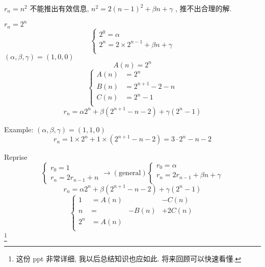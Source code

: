 \documentclass[mode=geye]{elegantnote}
\begin{document}
$ r_n = n^2 $ 不能推出有效信息, $ n^2 = 2(n-1)^2+\beta n + \gamma $ , 推不出合理的解.

$ r_n = 2^n $ 
\begin{equation*}
    \left\{
        \begin{array}{l}
            2^0=\alpha\\
            2^n=2\times 2^{n-1} + \beta n + \gamma\\
        \end{array}
    \right.
\end{equation*}
$ (\alpha, \beta, \gamma) = (1,0,0) $ 
\begin{equation*}
    A(n)=2^n
\end{equation*}
\begin{equation*}
    \left\{
        \begin{array}{ll}
            A(n) &= 2^n \\
            B(n) &= 2^{n+1}-2-n \\
            C(n) &= 2^n-1 \\
        \end{array}
    \right.
\end{equation*}
\begin{equation*}
    r_n = \alpha 2^n + \beta(2^{n+1}-n-2)+\gamma(2^n-1)
\end{equation*}

Example: 
$ (\alpha,\beta,\gamma)=(1,1,0) $ 
\begin{equation*}
    r_n = 1\times 2^n + 1\times (2^{n+1}-n-2) = 3\cdot 2^n-n-2
\end{equation*}

Reprise
\begin{equation*}
    \left\{
        \begin{array}{l}
            r_0 = 1\\
            r_n=2r_{n-1}+n
        \end{array}
    \right. \rightarrow(\text{general})
    \left\{
        \begin{array}{l}
            r_0 = \alpha\\
            r_n = 2r_{n-1}+\beta n+ \gamma\\
        \end{array}
    \right.
\end{equation*}
\begin{equation*}
    r_n = \alpha 2^n + \beta(2^{n+1}-n-2)+\gamma(2^n-1)
\end{equation*}
\begin{equation*}
    \left\{
        \begin{array}{llll}
            1   &= A(n)     &       &-C(n)  \\
            n   &=          &-B(n)  &+2C(n) \\
            2^n &= A(n)     &       &       \\
        \end{array}
    \right.
\end{equation*}
\footnote{这份 ppt 非常详细, 
我以后总结知识也应如此.
将来回顾可以快速看懂.}
\end{document}
